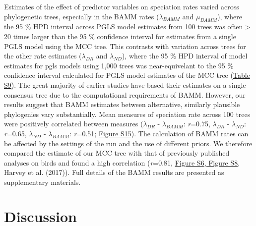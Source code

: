 \documentclass[]{article}
\begin{document}
Estimates of the effect of predictor variables on speciation rates
varied across phylogenetic trees, especially in the BAMM rates
(\(\lambda_{BAMM}\) and \(\mu_{BAMM}\)), where the 95 \% HPD interval
across PGLS model estimates from 100 trees was often \textgreater{} 20
times larger than the 95 \% confidence interval for estimates from a
single PGLS model using the MCC tree. This contrasts with variation
across trees for the other rate estimates (\(\lambda_{DR}\) and
\(\lambda_{ND}\)), where the 95 \% HPD interval of model estimates for
pgls models using 1,000 trees was near-equivelant to the 95 \%
confidence interval calculated for PGLS model estimates of the MCC tree
(\href{https://justincally.github.io/SexualSelection_Speciation/#pgls_models_on_bamm_estimates}{Table S9}).
The great majority of earlier studies have based their estimates on a
single consensus tree due to the computational requirements of BAMM.
However, our results suggest that BAMM estimates between alternative,
similarly plausible phylogenies vary substantially. Mean measures of
speciation rate across 100 trees were positively correlated between
measures (\(\lambda_{DR}\) - \(\lambda_{BAMM}\): \emph{r}=0.75,
\(\lambda_{DR}\) - \(\lambda_{ND}\): \emph{r}=0.65, \(\lambda_{ND}\) -
\(\lambda_{BAMM}\): \emph{r}=0.51;
\href{https://justincally.github.io/SexualSelection_Speciation/#additional_figures_and_tables}{Figure S15}).
The calculation of BAMM rates can be affected by the settings of the run
and the use of different priors. We therefore compared the estimate of
our MCC tree with that of previously published analyses on birds and
found a high correlation (\emph{r}=0.81,
\href{https://justincally.github.io/SexualSelection_Speciation/#bamm_measures_of_speciation_and_extinction}{Figure S6, Figure S8},
Harvey et al. (2017)). Full details of the BAMM results are presented as
supplementary materials.


\hypertarget{discussion}{%
\section{Discussion}\label{discussion}}
\end{document}
